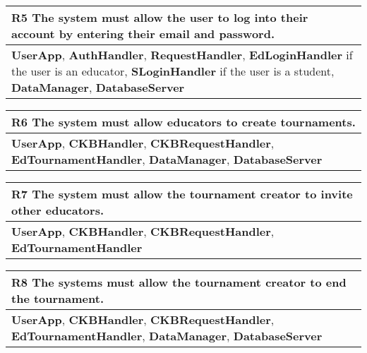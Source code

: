 \begin{table}[H]
    \begin{tabularx}{\textwidth}{X}
        \toprule
        \textbf{R5} The system must allow the user to log into their account by entering their email and password. \\ \midrule
        \textbf{UserApp}, \textbf{AuthHandler}, \textbf{RequestHandler}, \textbf{EdLoginHandler} if the user is an educator, \textbf{SLoginHandler} if the user is a student,
        \textbf{DataManager}, \textbf{DatabaseServer} \\                  
    \end{tabularx}
\end{table}

\begin{table}[H]
    \begin{tabularx}{\textwidth}{X}
        \toprule
        \textbf{R6} The system must allow educators to create tournaments. \\ \midrule
        \textbf{UserApp}, \textbf{CKBHandler}, \textbf{CKBRequestHandler}, \textbf{EdTournamentHandler}, \textbf{DataManager}, \textbf{DatabaseServer}                      \\
    \end{tabularx}
\end{table}

\begin{table}[H]
    \begin{tabularx}{\textwidth}{X}
        \toprule
        \textbf{R7} The system must allow the tournament creator to invite other educators. \\ \midrule
        \textbf{UserApp}, \textbf{CKBHandler}, \textbf{CKBRequestHandler}, \textbf{EdTournamentHandler}                    \\
    \end{tabularx}
\end{table}

\begin{table}[H]
    \begin{tabularx}{\textwidth}{X}
        \toprule
        \textbf{R8} The systems must allow the tournament creator to end the tournament. \\ \midrule
        \textbf{UserApp}, \textbf{CKBHandler}, \textbf{CKBRequestHandler}, \textbf{EdTournamentHandler}, \textbf{DataManager}, \textbf{DatabaseServer}                   \\
    \end{tabularx}
\end{table}

